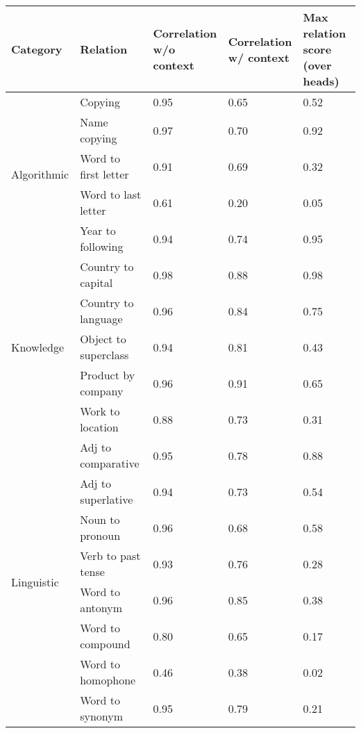\begin{tabular}{lllll}
\toprule
Category & Relation & \makecell{Correlation\\w/o context} & \makecell{Correlation\\w/ context} & \makecell{Max relation score\\(over heads)} \\
\midrule
\multirow{5}{*}{Algorithmic} & Copying & 0.95 & 0.65 & 0.52 \\
 & Name copying & 0.97 & 0.70 & 0.92 \\
 & Word to first letter & 0.91 & 0.69 & 0.32 \\
 & Word to last letter & 0.61 & 0.20 & 0.05 \\
 & Year to following & 0.94 & 0.74 & 0.95 \\
\multirow{5}{*}{Knowledge} & Country to capital & 0.98 & 0.88 & 0.98 \\
 & Country to language & 0.96 & 0.84 & 0.75 \\
 & Object to superclass & 0.94 & 0.81 & 0.43 \\
 & Product by company & 0.96 & 0.91 & 0.65 \\
 & Work to location & 0.88 & 0.73 & 0.31 \\
\multirow{8}{*}{Linguistic} & Adj to comparative & 0.95 & 0.78 & 0.88 \\
 & Adj to superlative & 0.94 & 0.73 & 0.54 \\
 & Noun to pronoun & 0.96 & 0.68 & 0.58 \\
 & Verb to past tense & 0.93 & 0.76 & 0.28 \\
 & Word to antonym & 0.96 & 0.85 & 0.38 \\
 & Word to compound & 0.80 & 0.65 & 0.17 \\
 & Word to homophone & 0.46 & 0.38 & 0.02 \\
 & Word to synonym & 0.95 & 0.79 & 0.21 \\
\bottomrule
\end{tabular}
